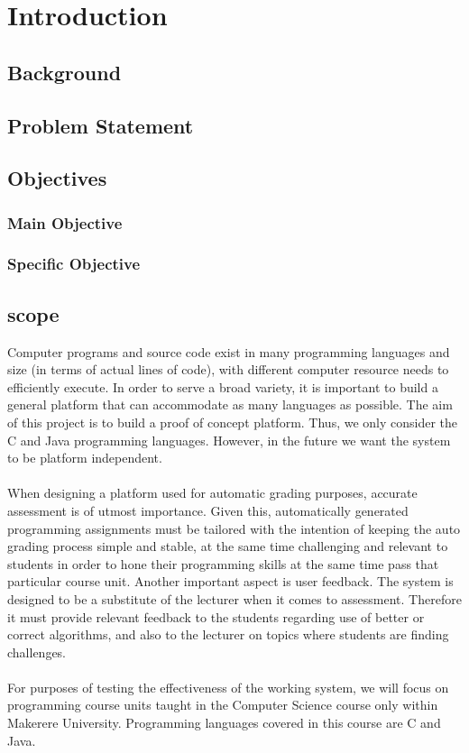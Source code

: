 \documentclass[12pt]{article}
\begin{document}
\section{Introduction}
	\subsection{Background}
	\subsection{Problem Statement}
	\subsection{Objectives}
		\subsubsection{Main Objective}
		\subsubsection{Specific Objective}
	\subsection{scope}
		Computer programs and source code exist in many programming languages and size (in
		terms of actual lines of code), with different computer resource needs to efficiently execute.
		In order to serve a broad variety, it is important to build a general platform that can
		accommodate as many languages as possible. The aim of this project is to build a proof of
		concept platform. Thus, we only consider the C and Java programming languages.
		However, in the future we want the system to be platform independent. \\ \\
			When designing a platform used for automatic grading purposes, accurate assessment is of
		utmost importance. Given this, automatically generated programming assignments must be
		tailored with the intention of keeping the auto grading process simple and stable, at the
		same time challenging and relevant to students in order to hone their programming skills
		at the same time pass that particular course unit. Another important aspect is user feedback.
		The system is designed to be a substitute of the lecturer when it comes to assessment.
		Therefore it must provide relevant feedback to the students regarding use of better or
		correct algorithms, and also to the lecturer on topics where students are finding challenges.\\ \\
			For purposes of testing the effectiveness of the working system, we will focus on
		programming course units taught in the Computer Science course only within Makerere
		University. Programming languages covered in this course are C and Java.
\end{document}
